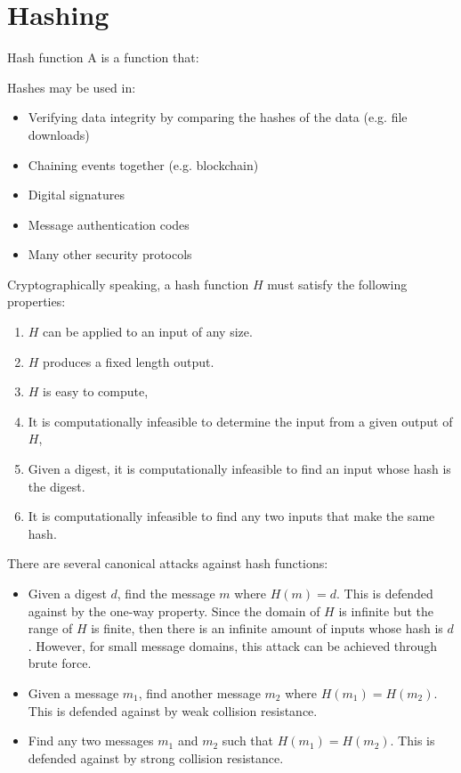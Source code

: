 \chapter{Hashing}

\begin{dfnbox}{Hash function}{}
    A  is a function that:
\end{dfnbox}

Hashes may be used in:
\begin{itemize}
    \item Verifying data integrity by comparing the hashes of the data (e.g. file downloads)
    \item Chaining events together (e.g. blockchain)
    \item Digital signatures
    \item Message authentication codes
    \item Many other security protocols
\end{itemize}

Cryptographically speaking, a hash function $H$ must satisfy the following properties:
\begin{enumerate}
    \item $H$ can be applied to an input of any size.
    \item $H$ produces a fixed length output.
    \item $H$ is easy to compute,
    \item {} It is computationally infeasible to determine the input from a given output of $H$,
    \item {} Given a digest, it is computationally infeasible to find an input whose hash is the digest.
    \item {} It is computationally infeasible to find any two inputs that make the same hash.
\end{enumerate}

There are several canonical attacks against hash functions:
\begin{itemize}
    \item {} Given a digest $d$, find the message $m$ where $H(m) = d$. This is defended against by the one-way property. Since the domain of $H$ is infinite but the range of $H$ is finite, then there is an infinite amount of inputs whose hash is $d$. However, for small message domains, this attack can be achieved through brute force.
    \item {} Given a message $m_1$, find another message $m_2$ where $H(m_1) = H(m_2)$. This is defended against by weak collision resistance.
    \item {} Find any two messages $m_1$ and $m_2$ such that $H(m_1) = H(m_2)$. This is defended against by strong collision resistance.
\end{itemize}

